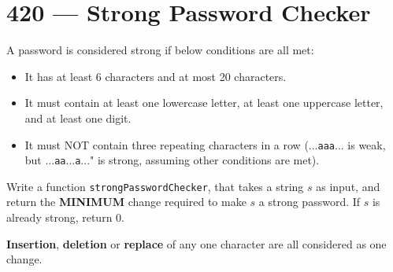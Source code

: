 \section{420 --- Strong Password Checker}
A password is considered strong if below conditions are all met:

\begin{itemize}
\item It has at least 6 characters and at most 20 characters.
\item It must contain at least one lowercase letter, at least one uppercase letter, and at least one digit.
\item It must NOT contain three repeating characters in a row (...\texttt{aaa}... is weak, but ...\texttt{aa}...\texttt{a}..." is strong, assuming other conditions are met).
\end{itemize}

Write a function \texttt{strongPasswordChecker}, that takes a string $s$ as input, and return the \textbf{MINIMUM} change required to make $ s $ a strong password. If $ s $ is already strong, return 0.
\par
\textbf{Insertion}, \textbf{deletion} or \textbf{replace} of any one character are all considered as one change.

